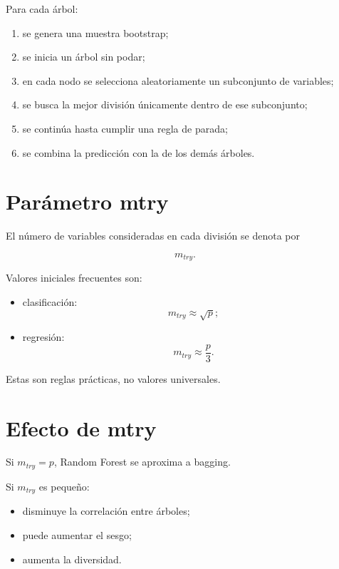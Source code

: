 \documentclass[
  spanish,
  10.5pt,
  letterpaper,
  DIV=11,
  numbers=noendperiod,
  oneside,
  open=any]{scrreprt}
\providecommand{\tightlist}{%
  \setlength{\itemsep}{0pt}\setlength{\parskip}{0pt}}
\theoremstyle{definition}
\theoremstyle{definition}
\theoremstyle{plain}
\theoremstyle{remark}
\begin{document}
Para cada árbol:

\begin{enumerate}
\def\labelenumi{\arabic{enumi}.}
\tightlist
\item
  se genera una muestra bootstrap;
\item
  se inicia un árbol sin podar;
\item
  en cada nodo se selecciona aleatoriamente un subconjunto de variables;
\item
  se busca la mejor división únicamente dentro de ese subconjunto;
\item
  se continúa hasta cumplir una regla de parada;
\item
  se combina la predicción con la de los demás árboles.
\end{enumerate}

\section*{Parámetro mtry}\label{paruxe1metro-mtry}


El número de variables consideradas en cada división se denota por

\[
m_{try}.
\]

Valores iniciales frecuentes son:

\begin{itemize}
\tightlist
\item
  clasificación: \[
  m_{try}\approx\sqrt{p};
  \]
\item
  regresión: \[
  m_{try}\approx\frac{p}{3}.
  \]
\end{itemize}

Estas son reglas prácticas, no valores universales.

\section*{Efecto de mtry}\label{efecto-de-mtry}


Si \(m_{try}=p\), Random Forest se aproxima a bagging.

Si \(m_{try}\) es pequeño:

\begin{itemize}
\tightlist
\item
  disminuye la correlación entre árboles;
\item
  puede aumentar el sesgo;
\item
  aumenta la diversidad.
\end{itemize}
\end{document}
